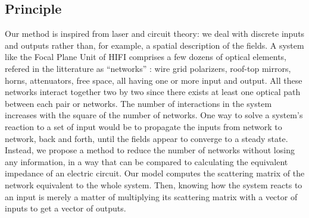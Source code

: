 \documentclass[a4paper,11pt]{article}
\begin{document}
\subsection{Principle}
Our method is inspired from laser and circuit theory: we deal with discrete inputs and outputs rather than, for example, a spatial description of the fields.
A system like the Focal Plane Unit of HIFI comprises a few dozens of optical elements, refered in the litterature as ``networks'' \cite{siegman1986lasers}: wire grid polarizers, roof-top mirrors, horns, attenuators, free space, all having one or more input and output.
All these networks interact together two by two since there exists at least one optical path between each pair or networks.
The number of interactions in the system increases with the square of the number of networks.
One way to solve a system's reaction to a set of input would be to propagate the inputs from network to network, back and forth, until the fields appear to converge to a steady state.
Instead, we propose a method to reduce the number of networks without losing any information, in a way that can be compared to calculating the equivalent impedance of an electric circuit.
Our model computes the scattering matrix of the network equivalent to the whole system.
Then, knowing how the system reacts to an input is merely a matter of multiplying its scattering matrix with a vector of inputs to get a vector of outputs.
\end{document}
